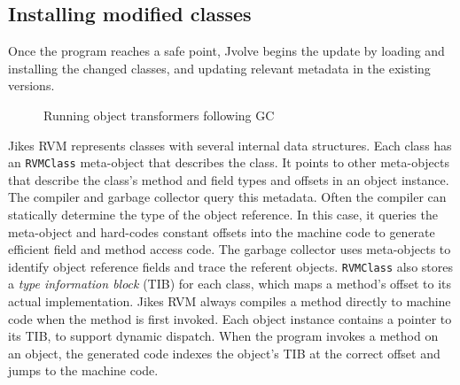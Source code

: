 \documentclass[9pt]{sigplanconf}
\newcommand{\DSU}{{\sc Jvolve}}
\newcommand{\VMClass}{\texttt{RVMClass}}
\newcommand{\JikesRVM}{Jikes RVM}
\begin{document}
\subsection{Installing modified classes}
\label{sec:loading}

Once the program reaches a safe point, \DSU{} begins the update by
loading and installing the changed classes, and updating relevant
metadata in the existing versions.

\begin{figure}[t]
% 
\begin{center}
% 
\end{center}
\caption{Running object transformers following GC}
\label{fig:gc-example}
\end{figure}

\JikesRVM{} represents  classes with several internal data structures.
Each class has an \VMClass{} meta-object that describes
the class.  It points to other meta-objects that describe the class's
method and field types and offsets in an object instance.  
The compiler and garbage collector query this metadata.  Often the
compiler can statically determine the type of the object reference. In
this case, it queries the meta-object and hard-codes constant offsets
into the machine code to generate efficient field and method access
code.
The garbage collector uses meta-objects to identify object reference fields and
trace the referent objects.
\VMClass{} also stores a \emph{type information block} (TIB) for each
class, which maps a method's offset to its actual implementation.
\JikesRVM{} always compiles a method directly to machine
code when the method is first invoked.  Each object instance
contains a pointer to its TIB, to support dynamic dispatch.  When the
program invokes a method on an object, the generated code
indexes the object's TIB at the correct offset and jumps to the
machine code.
\end{document}
